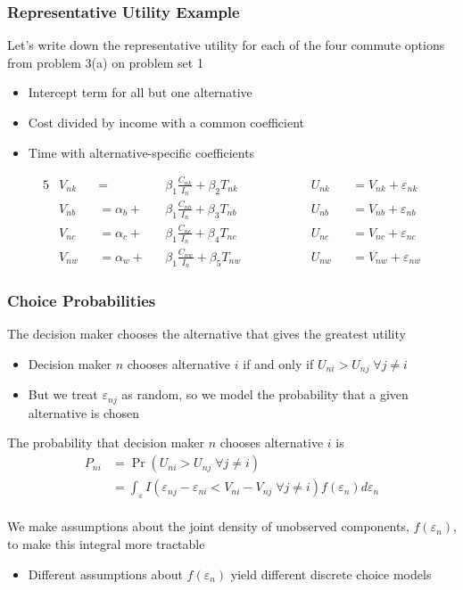 \documentclass{beamer}\usepackage[]{graphicx}\usepackage[]{color}
\begin{document}
\begin{frame}\frametitle{Representative Utility Example}
    Let's write down the representative utility for each of the four commute options from problem 3(a) on problem set 1
    \begin{itemize}
    	\item Intercept term for all but one alternative
    	\item Cost divided by income with a common coefficient
    	\item Time with alternative-specific coefficients
    \end{itemize}
    \begin{alignat*}{5}
    	&V_{nk} &&= &&\beta_1 \frac{C_{nk}}{I_n} + \beta_2 T_{nk} \qquad \qquad && U_{nk} &&= V_{nk} + \varepsilon_{nk} \\
    	&V_{nb} &&= \alpha_b + &&\beta_1 \frac{C_{nb}}{I_n} + \beta_3 T_{nb} \qquad \qquad && U_{nb} &&= V_{nb} + \varepsilon_{nb} \\
    	&V_{nc} &&= \alpha_c + &&\beta_1 \frac{C_{nc}}{I_n} + \beta_4 T_{nc} \qquad \qquad && U_{nc} &&= V_{nc} + \varepsilon_{nc} \\
    	&V_{nw} &&= \alpha_w + &&\beta_1 \frac{C_{nw}}{I_n} + \beta_5 T_{nw} \qquad \qquad && U_{nw} &&= V_{nw} + \varepsilon_{nw} 
    \end{alignat*}
\end{frame}

\begin{frame}\frametitle{Choice Probabilities}
	The decision maker chooses the alternative that gives the greatest utility
	\begin{itemize}
		\item Decision maker $n$ chooses alternative $i$ if and only if $U_{ni} > U_{nj} \; \forall j \neq i$
		\item But we treat $\varepsilon_{nj}$ as random, so we model the probability that a given alternative is chosen
	\end{itemize}
	\vspace{2ex}
    The probability that decision maker $n$ chooses alternative $i$ is
    \begin{align*}
    	P_{ni} &= \Pr(U_{ni} > U_{nj} \; \forall j \neq i) \\
    	&= \int_\varepsilon I(\varepsilon_{nj} - \varepsilon_{ni} < V_{ni} - V_{nj} \; \forall j \neq i) f(\varepsilon_n) d\varepsilon_n
    \end{align*} \\
    \vspace{2ex}
    We make assumptions about the joint density of unobserved components, $f(\varepsilon_n)$, to make this integral more tractable
    \begin{itemize}
    	\item Different assumptions about $f(\varepsilon_n)$ yield different discrete choice models
    \end{itemize}
\end{frame}
\end{document}

